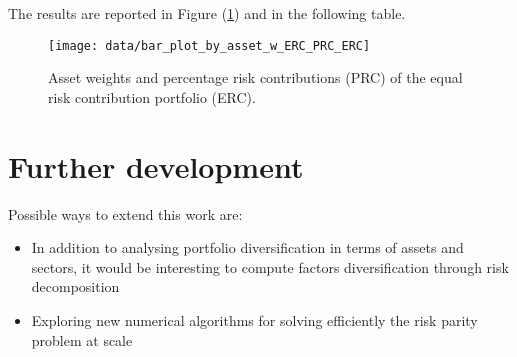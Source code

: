 \documentclass[12pt, a4paper]{article}
\theoremstyle{problemstyle}
\begin{document}
The results are reported in Figure (\ref{fig:histo_ERC}) and in the following table.
\begin{figure}[H]
	\centering
	\texttt{[image: data/bar\_plot\_by\_asset\_w\_ERC\_PRC\_ERC]}
	\caption{Asset weights and percentage risk contributions (PRC) of the equal risk contribution portfolio (ERC).}
	\label{fig:histo_ERC}
\end{figure}

\centering


\section{Further development}
Possible ways to extend this work are:
\begin{itemize}
	\item In addition to analysing portfolio diversification in terms of assets and sectors, it would be interesting to compute factors diversification through risk decomposition \cite{risk_parity} 
	\item Exploring new numerical algorithms for solving efficiently the risk parity problem at scale \cite{iterative_meth}
\end{itemize} 
\nocite{*}


\end{document}
